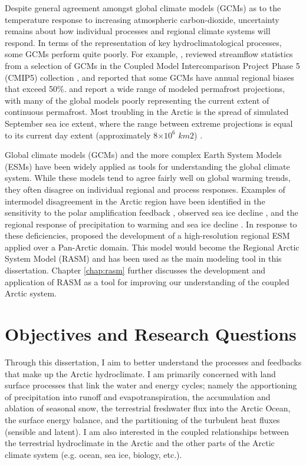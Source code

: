 Despite general agreement amongst global climate models (GCMs) as to the temperature response to increasing atmospheric carbon-dioxide, uncertainty remains about how individual processes and regional climate systems will respond.
In terms of the representation of key hydroclimatological processes, some GCMs perform quite poorly.
For example, \citet{Alkama_2013}, reviewed streamflow statistics from a selection of GCMs in the Coupled Model Intercomparison Project Phase 5 (CMIP5) collection \citet{Taylor_2012}, and reported that some GCMs have annual regional biases that exceed 50\%.
\citet{Slater_2013} and \citet{Koven_2013} report a wide range of modeled permafrost projections, with many of the global models poorly representing the current extent of continuous permafrost.
Most troubling in the Arctic is the spread of simulated September sea ice extent, where the range between extreme projections is equal to its current day extent (approximately 8$×10^6$ $km2$) \citep[e.g.][]{Maslowski_2012}.

Global climate models (GCMs) and the more complex Earth System Models (ESMs) have been widely applied as tools for understanding the global climate system.
While these models tend to agree fairly well on global warming trends, they often disagree on individual regional and process responses.
Examples of intermodel disagreement in the Arctic region have been identified in the sensitivity to the polar amplification feedback \citep{Serreze_2006b,Holland_2003}, observed sea ice decline \citep{Stroeve_2007,Zhang_2010}, and the regional response of precipitation to warming and sea ice decline \citep{Bintanja_2014}.
In response to these deficiencies, \citet{Roberts_2010} proposed the development of a high-resolution regional ESM applied over a Pan-Arctic domain.
This model would become the Regional Arctic System Model (RASM) and has been used as the main modeling tool in this dissertation.
Chapter \ref{chap:rasm} further discusses the development and application of RASM as a tool for improving our understanding of the coupled Arctic system.

\section{Objectives and Research Questions}

Through this dissertation, I aim to better understand the processes and feedbacks that make up the Arctic hydroclimate.
I am primarily concerned with land surface processes that link the water and energy cycles; namely the apportioning of precipitation into runoff and evapotranspiration, the accumulation and ablation of seasonal snow, the terrestrial freshwater flux into the Arctic Ocean, the surface energy balance, and the partitioning of the turbulent heat fluxes (sensible and latent).
I am also interested in the coupled relationships between the terrestrial hydroclimate in the Arctic and the other parts of the Arctic climate system (e.g. ocean, sea ice, biology, etc.).


